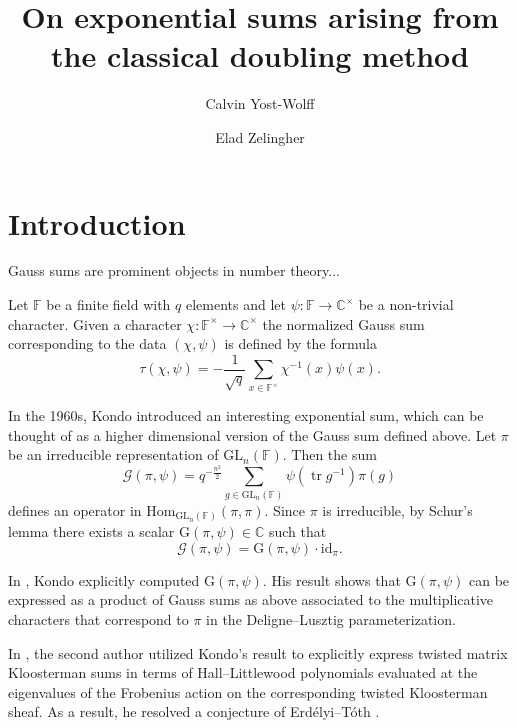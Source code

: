 \documentclass[12pt, reqno]{amsart}
\title[Doubling method exponential sums]{On exponential sums arising from the classical doubling method}
\author{Calvin Yost-Wolff}
\author{Elad Zelingher}
\theoremstyle{definition}
\theoremstyle{definition}
\theoremstyle{definition}
\newcommand{\cComplex}{\mathbb{C}}
\newcommand{\multiplicativegroup}[1]{#1^{\times}}
\newcommand{\Hom}{\mathrm{Hom}}
\newcommand{\idmap}{\mathrm{id}}
\newcommand{\Erdelyi}{Erd{\'e}lyi}
\newcommand{\Toth}{T{\'o}th}
\newcommand{\fieldCharacter}{\psi}
\newcommand{\trace}{\operatorname{tr}}
\newcommand{\GL}{\mathrm{GL}}
\newcommand{\finiteField}{\mathbb{F}}
\newcommand{\GaussSum}[2]{\mathcal{G}\left(#1, #2\right)}
\newcommand{\GaussSumSingleCharacter}[2]{\tau\left(#1, #2\right)}
\newcommand{\GaussSumScalar}[2]{\mathrm{G}\left(#1, #2\right)}
\begin{document}
\begin{abstract}
\end{abstract}
\maketitle

\tableofcontents

\section{Introduction}

Gauss sums are prominent objects in number theory...

Let $\finiteField$ be a finite field with $q$ elements and let $\fieldCharacter \colon \finiteField \to \multiplicativegroup{\cComplex}$ be a non-trivial character. Given a character $\chi \colon \multiplicativegroup{\finiteField} \to \multiplicativegroup{\cComplex}$ the normalized Gauss sum corresponding to the data $\left(\chi, \fieldCharacter\right)$ is defined by the formula
$$\GaussSumSingleCharacter{\chi}{\fieldCharacter} = -\frac{1}{\sqrt{q}}\sum_{x \in \multiplicativegroup{\finiteField}} \chi^{-1}\left(x\right) \fieldCharacter\left(x\right).$$

In the 1960s, Kondo \cite{Kondo1963} introduced an interesting exponential sum, which can be thought of as a higher dimensional version of the Gauss sum defined above. Let $\pi$ be an irreducible representation of $\GL_n\left(\finiteField\right)$. Then the sum $$\GaussSum{\pi}{\fieldCharacter} = q^{-\frac{n^2}{2}} \sum_{g \in \GL_n\left(\finiteField\right)} \fieldCharacter\left(\trace g^{-1}\right) \pi\left(g\right)$$
defines an operator in $\Hom_{\GL_n\left(\finiteField\right)}\left(\pi, \pi\right)$. Since $\pi$ is irreducible, by Schur's lemma there exists a scalar $\GaussSumScalar{\pi}{\fieldCharacter} \in \cComplex$ such that $$\GaussSum{\pi}{\fieldCharacter} = \GaussSumScalar{\pi}{\fieldCharacter} \cdot \idmap_{\pi}.$$

In \cite{Kondo1963}, Kondo explicitly computed $\GaussSumScalar{\pi}{\fieldCharacter}$. His result shows that $\GaussSumScalar{\pi}{\fieldCharacter}$ can be expressed as a product of Gauss sums as above associated to the multiplicative characters that correspond to $\pi$ in the Deligne--Lusztig parameterization.

In \cite{Zelingher2024}, the second author utilized Kondo's result to explicitly express twisted matrix Kloosterman sums in terms of Hall--Littlewood polynomials evaluated at the eigenvalues of the Frobenius action on the corresponding twisted Kloosterman sheaf. As a result, he resolved a conjecture of \Erdelyi{}--\Toth{} \cite{ErdelyiToth2024}.
\end{document}

